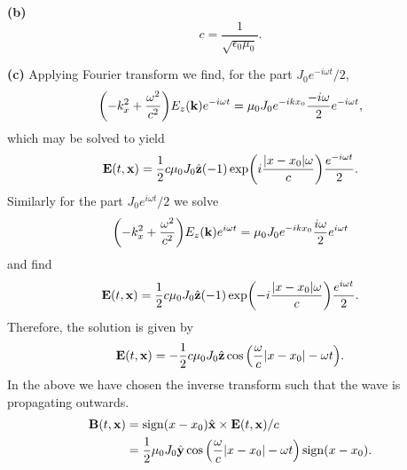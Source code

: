 \documentclass{article}
\makeatletter
\newcommand*{\shifttext}[1]{%
  \settowidth{\@tempdima}{#1}%
  \hspace{-\@tempdima}#1%
}
\newcommand{\plabel}[1]{%
\shifttext{\textbf{#1}\quad}%
}
\newcommand{\minusbaseline}{\abovedisplayskip=0pt\abovedisplayshortskip=0pt~\vspace*{-\baselineskip}}%
\makeatother
\begin{document}
\plabel{(b)}%
\begingroup\minusbaseline%
\[ c = \frac{1}{\sqrt{\epsilon_0\mu_0}}. \]
\endgroup

\plabel{(c)}%
Applying Fourier transform we find, for the part $J_0 e^{-i\omega t} / 2$,
\[ \qty(-k_x^2 + \frac{\omega^2}{c^2}) E_z(\vb{k})e^{-i\omega t} = \mu_0 J_0 e^{-ikx_0}\frac{-i \omega}{2}e^{-i\omega t}, \]
which may be solved to yield
\[ \vb{E}(t,\vb{x}) = \frac{1}{2} c \mu_0 J_0 \hat{\vb{z}} (-1)\exp(i\frac{\abs{x-x_0}\omega}{c}) \frac{e^{-i\omega t}}{2}. \]
Similarly for the part $J_0 e^{i\omega t} / 2$ we solve
\[ \qty(-k_x^2 + \frac{\omega^2}{c^2}) E_z(\vb{k})e^{i\omega t} = \mu_0 J_0 e^{-ikx_0}\frac{i\omega}{2}e^{i\omega t} \]
and find
\[ \vb{E}(t,\vb{x}) = \frac{1}{2} c \mu_0 J_0 \hat{\vb{z}} (-1)\exp(-i\frac{\abs{x-x_0}\omega}{c}) \frac{e^{i\omega t}}{2}. \]
Therefore, the solution is given by
\[ \vb{E}(t,\vb{x}) = -\frac{1}{2} c \mu_0 J_0 \hat{\vb{z}} \cos \qty(\frac{\omega}{c}\abs{x-x_0} - \omega t). \]
In the above we have chosen the inverse transform such that the wave is propagating outwards.
\begin{align*}
    \vb{B}(t,\vb{x}) &= \operatorname{sign}(x - x_0) \hat{\vb{x}}\times \vb{E}(t,\vb{x})/c \\
    &= \frac{1}{2} \mu_0 J_0 \hat{\vb{y}} \cos \qty(\frac{\omega}{c}\abs{x-x_0} - \omega t)\operatorname{sign}(x-x_0).
\end{align*}


% 
% 
\end{document}
